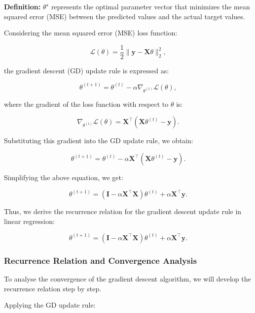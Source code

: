 \textbf{Definition:} \(\theta^\star\) represents the optimal parameter vector that minimizes the mean squared error (MSE) between the predicted values and the actual target values.

Considering the mean squared error (MSE) loss function:

\[
    \mathcal{L}(\theta) = \frac{1}{2} \|\boldsymbol{y} - \boldsymbol{X} \theta\|_2^2,
\]

the gradient descent (GD) update rule is expressed as:

\[
    \theta^{(t+1)} = \theta^{(t)} - \alpha \nabla_{\theta^{(t)}} \mathcal{L}(\theta),
\]

where the gradient of the loss function with respect to \(\theta\) is:

\[
    \nabla_{\theta^{(t)}} \mathcal{L}(\theta) = \boldsymbol{X}^\top (\boldsymbol{X} \theta^{(t)} - \boldsymbol{y}).
\]

Substituting this gradient into the GD update rule, we obtain:

\[
    \theta^{(t+1)} = \theta^{(t)} - \alpha \boldsymbol{X}^\top (\boldsymbol{X} \theta^{(t)} - \boldsymbol{y}).
\]

Simplifying the above equation, we get:

\[
    \theta^{(t+1)} = (\mathbf{I} - \alpha \boldsymbol{X}^\top \boldsymbol{X}) \theta^{(t)} + \alpha \boldsymbol{X}^\top \boldsymbol{y}.
\]

Thus, we derive the recurrence relation for the gradient descent update rule in linear regression:

\[
    \theta^{(t+1)} = (\mathbf{I} - \alpha \boldsymbol{X}^\top \boldsymbol{X}) \theta^{(t)} + \alpha \boldsymbol{X}^\top \boldsymbol{y}.
\]

\subsubsection{Recurrence Relation and Convergence Analysis}

To analyse the convergence of the gradient descent algorithm, we will develop the recurrence relation step by step.




Applying the GD update rule:

